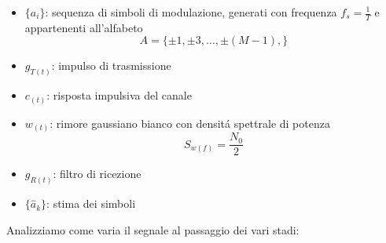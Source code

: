             \begin{itemize}
                \item {$\{a_i\}$: sequenza di simboli di modulazione, generati con frequenza $f_s=\frac{1}{T}$ e appartenenti all'alfabeto
                \[
                    A = \{\pm 1,\pm 3, \dots, \pm (M-1),\}  
                \]}
                \item {$g_{T(t)}$: impulso di trasmissione}
                \item {$c_{(t)}$: risposta impulsiva del canale}
                \item {$w_{(t)}$: rimore gaussiano bianco con densitá spettrale di potenza\[
                    S_{w(f)} = \frac{N_0}{2}  
                \]}
                \item {$g_{R(t)}$: filtro di ricezione}
                \item {$\{\hat{a}_k\}$: stima dei simboli}
            \end{itemize}
            Analizziamo come varia il segnale al passaggio dei vari stadi:
